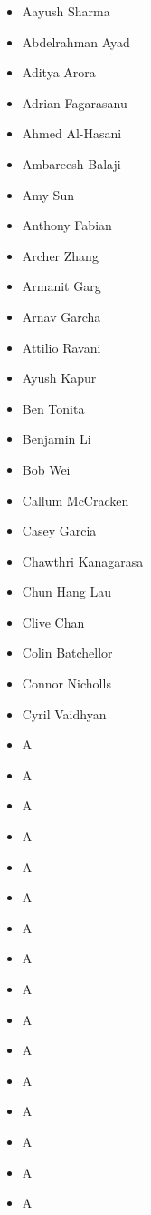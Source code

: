 \documentclass[main.tex]{subfiles}
\begin{document}
\begin{multicols}{4}
 \begin{itemize}[label={},noitemsep]
     \item {Aayush Sharma}
     \item {Abdelrahman Ayad}
     \item {Aditya Arora}
     \item {Adrian Fagarasanu}
     \item {Ahmed Al-Hasani}
	 \item {Ambareesh Balaji}
     \item {Amy Sun}
	 \item {Anthony Fabian}
     \item {Archer Zhang}
	 \item {Armanit Garg}
     \item {Arnav Garcha}
	 \item {Attilio Ravani}
     \item {Ayush Kapur}
	 \item {Ben Tonita}
     \item {Benjamin Li}
	 \item {Bob Wei}
     \item {Callum McCracken}
	 \item {Casey Garcia}
     \item {Chawthri Kanagarasa}
	 \item {Chun Hang Lau}
     \item {Clive Chan}
	 \item {Colin Batchellor}
     \item {Connor Nicholls}
	 \item {Cyril Vaidhyan}
     \item {A}
	 \item {A}
     \item {A}
	 \item {A}
     \item {A}
	 \item {A}
     \item {A}
	 \item {A}
     \item {A}
	 \item {A}
     \item {A}
	 \item {A}
     \item {A}
	 \item {A}
     \item {A}
	 \item {A}

\end{itemize}
\end{multicols}
\end{document}
